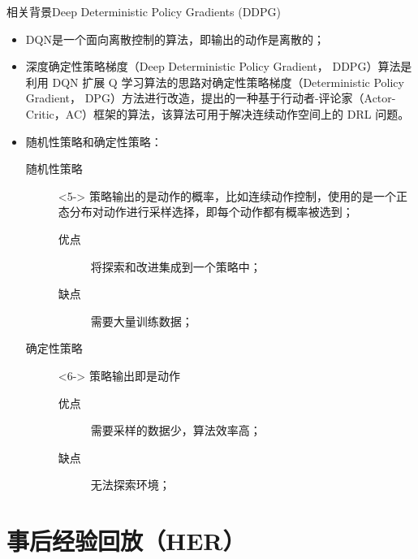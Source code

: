 \documentclass[10pt]{beamer}
\begin{document}
	\begin{frame}{相关背景}{Deep Deterministic Policy Gradients (DDPG)}
		\begin{itemize}
			\item<2-> DQN是一个面向离散控制的算法，即输出的动作是离散的；
			
			\item<3-> 深度确定性策略梯度（Deep Deterministic Policy Gradient， DDPG）算法是利用 DQN 扩展 Q 学习算法的思路对确定性策略梯度（Deterministic Policy Gradient， DPG）方法进行改造，提出的一种基于行动者-评论家（Actor-Critic，AC）框架的算法，该算法可用于解决连续动作空间上的 DRL 问题。
			
			\item<4-> 随机性策略和确定性策略：
				\begin{description}
					\item[随机性策略]<5-> 策略输出的是动作的概率，比如连续动作控制，使用的是一个正态分布对动作进行采样选择，即每个动作都有概率被选到；
						\begin{description}
							\item[优点] 将探索和改进集成到一个策略中；
							\item[缺点] 需要大量训练数据；
						\end{description}
					
					\item [确定性策略]<6-> 策略输出即是动作
						\begin{description}
							\item[优点] 需要采样的数据少，算法效率高；
							\item[缺点] 无法探索环境；
						\end{description}
				\end{description}
			
		\end{itemize}
	\end{frame}
	
	\section{事后经验回放（HER）}
	
\end{document}
